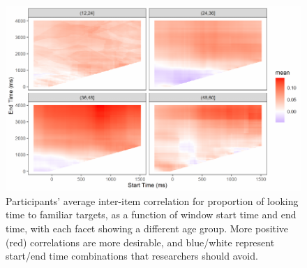 \documentclass[10pt, letterpaper]{article}
\newenvironment{CodeChunk}{}{}
\begin{document}
\begin{CodeChunk}
\begin{figure}[h]

{\centering \includegraphics{figs/time_window-1} 

}

\caption[Participants' average inter-item correlation for proportion of looking time to familiar targets, as a function of window start time and end time, with each facet showing a different age group]{Participants' average inter-item correlation for proportion of looking time to familiar targets, as a function of window start time and end time, with each facet showing a different age group. More positive (red) correlations are more desirable, and blue/white represent start/end time combinations that researchers should avoid.}\label{fig:time_window}
\end{figure}
\end{CodeChunk}
\end{document}
